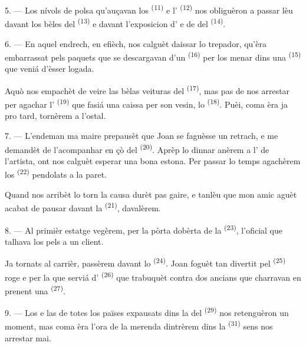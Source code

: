 5. --- Los nívols de polsa qu'auçavan los 
\textsuperscript{(11)} e l' \textsuperscript{(12)} nos
obliguèron a passar lèu davant los bèles  del
 \textsuperscript{(13)} e davant l'exposicion d' e
de  del  \textsuperscript{(14)}.

6. --- En aquel endrech, en efièch, nos calguèt daissar lo trepador, qu'èra
embarrassat pels paquets que se descargavan d'un 
\textsuperscript{(16)} per los menar dins una 
\textsuperscript{(15)} que veniá d'èsser logada.

Aquò nos empachèt de veire las bèlas veituras del 
\textsuperscript{(17)}, mas pas de nos arrestar per agachar l'
\textsuperscript{(19)} que fasiá una caissa per son vesin, lo  \textsuperscript{(18)}. Puèi, coma èra ja pro tard,
tornèrem a l'ostal.

\VUsaut{3.0mm}

7. --- L'endeman ma maire prepausèt que Joan se faguèsse un retrach, e me demandèt
de l'acompanhar en çò del  \textsuperscript{(20)}. Aprèp lo
dinnar anèrem a l' de l'artista, ont nos calguèt esperar una bona
estona. Per passar lo temps agachèrem los 
\textsuperscript{(22)} pendolats a la paret.

Quand nos arribèt lo torn la causa durèt pas gaire, e tanlèu que mon amic aguèt
acabat de pausar davant la  \textsuperscript{(21)}, davalèrem.

8. --- Al primièr estatge vegèrem, per la pòrta dobèrta de la 
\textsuperscript{(23)}, l'oficial que talhava los pels a un client.

Ja tornats al carrièr, passèrem davant lo 
\textsuperscript{(24)}. Joan foguèt tan divertit pel 
\textsuperscript{(25)} roge e per la  que serviá
d' \textsuperscript{(26)} que trabuquèt contra dos ancians que
charravan en prenent una  \textsuperscript{(27)}.

\VUsaut{3.0mm}

9. --- Los  e las  de totes los païses expausats
dins la  del  \textsuperscript{(29)} nos
retenguèron un moment, mas coma èra l'ora de la merenda dintrèrem dins la
 \textsuperscript{(31)} sens nos arrestar mai.

